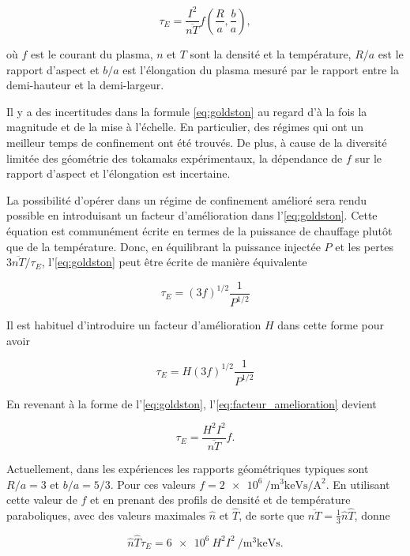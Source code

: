 \documentclass[main.tex]{subfiles}
\begin{document}
\begin{equation}
	\tau_E = \frac{I^2}{\overline{n T}} f \left(\frac{R}{a}, \frac{b}{a} \right),
	\label{eq:goldston}
\end{equation}

où \( f \) est le courant du plasma, \( n \) et \( T \) sont la densité et la température, \( R/a \) est le rapport d'aspect et \( b/a \) est l'élongation du plasma mesuré par le rapport entre la demi-hauteur et la demi-largeur.

Il y a des incertitudes dans la formule \ref{eq:goldston} au regard d'à la fois la magnitude et de la mise à l'échelle.
En particulier, des régimes qui ont un meilleur temps de confinement ont été trouvés.
De plus, à cause de la diversité limitée des géométrie des tokamaks expérimentaux, la dépendance de \( f \) sur le rapport d'aspect et l'élongation est incertaine.

La possibilité d'opérer dans un régime de confinement amélioré sera rendu possible en introduisant un facteur d'amélioration dans l'\autoref{eq:goldston}.
Cette équation est communément écrite en termes de la puissance de chauffage plutôt que de la température.
Donc, en équilibrant la puissance injectée \( P \) et les pertes \( 3 \overline{n T}/\tau_E \), l'\autoref{eq:goldston} peut être écrite de manière équivalente

\[
	\tau_E = (3f)^{1/2} \frac{1}{P^{1/2}}
\]

Il est habituel d'introduire un facteur d'amélioration \( H \) dans cette forme pour avoir

\begin{equation}
	\tau_E = H (3f)^{1/2} \frac{1}{P^{1/2}}
	\label{eq:facteur_amelioration}
\end{equation}

En revenant à la forme de l'\autoref{eq:goldston}, l'\autoref{eq:facteur_amelioration} devient

\[
	\tau_E = \frac{H^2 I^2}{\overline{n T}} f.
\]

Actuellement, dans les expériences  les rapports géométriques typiques sont \( R/a =3 \) et \( b/a = 5/3 \).
Pour ces valeurs \(f = \SI{2e6}{\per\meter\cubed\kilo\electronvolt\second\per\ampere\squared} \).
En utilisant cette valeur de \( f \) et en prenant des profils de densité et de température paraboliques, avec des valeurs maximales \( \hat{n} \) et \( \hat{T} \), de sorte que \( \overline{n T} = \frac{1}{3} \hat{n}\hat{T}\), donne

\[
	\hat{n}\hat{T}\tau_E = \SI{6e6}{} H^2I^2 \SI{}{\per\meter\cubed\kilo\electronvolt\second}.
\]
\end{document}
